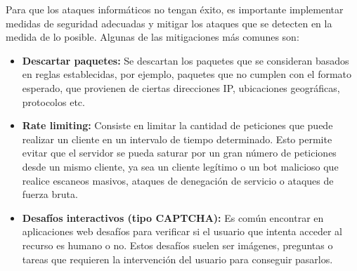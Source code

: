 Para que los ataques informáticos no tengan éxito, es importante implementar medidas de seguridad adecuadas y mitigar los ataques que se detecten en la medida de lo posible. 
Algunas de las mitigaciones más comunes son:
\begin{itemize}
	\item \textbf{Descartar paquetes:} Se descartan los paquetes que se consideran basados en reglas establecidas, por ejemplo, paquetes que no cumplen con el formato esperado, que provienen de ciertas direcciones IP, ubicaciones geográficas, protocolos etc. ~\cite{Yungaicela-Naula2022, Liu2018} 

    \item \textbf{Rate limiting:} Consiste en limitar la cantidad de peticiones que puede realizar un cliente en un intervalo de tiempo determinado. Esto permite evitar que el servidor se pueda saturar por un gran número de peticiones desde un mismo cliente, ya sea un cliente legítimo o un bot malicioso que realice escaneos masivos, ataques de denegación de servicio o ataques de fuerza bruta.

    \item \textbf{Desafíos interactivos (tipo CAPTCHA):} Es común encontrar en aplicaciones web desafíos para verificar si el usuario que intenta acceder al recurso es humano o no. Estos desafíos suelen ser imágenes, preguntas o tareas que requieren la intervención del usuario para conseguir pasarlos.~\cite{CloudflareDocsTeam2025}
\end{itemize}